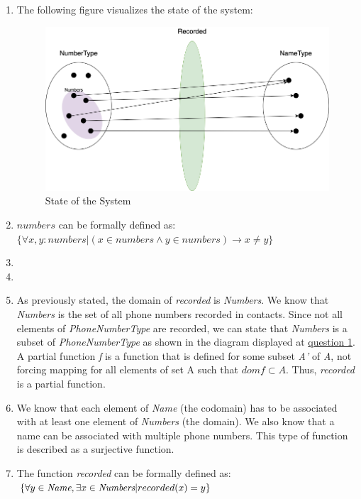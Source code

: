\begin{enumerate}
    \item The following figure visualizes the state of the system:
        \begin{figure}[h]
        \centering
        \includegraphics[scale=0.45]{images/Diagram.png}
        \caption{State of the System}
        \label{fig:Diagram}
        \end{figure}
    \item $numbers$ can be formally defined as: \\
    $\{ \forall x, y: numbers | (x \in numbers \wedge y \in numbers) \rightarrow x \neq y \}$
    \item
    \item
    \item As previously stated, the domain of \emph{recorded} is \emph{Numbers}. We know that \emph{Numbers} is the set 
    of all phone numbers recorded in contacts. Since not all elements of \emph{PhoneNumberType} are recorded, we can
    state that \emph{Numbers} is a subset of \emph{PhoneNumberType} as shown in the diagram displayed at \underline{question 1}.
    A partial function \emph{f} is a function that is defined for some subset \emph{A'} of \emph{A}, not forcing mapping for 
    all elements of set A such that $dom f \subset A$. Thus, \emph{recorded} is a partial function.
    \item We know that each element of \emph{Name} (the codomain) has to be associated with at least one element of 
    \emph{Numbers} (the domain). We also know that a name can be associated with multiple phone numbers. This type of 
    function is described as a surjective function. 
    \item The function \emph{recorded} can be formally defined as:\\
    $\{ \forall y \in \emph{Name},   \exists x \in \emph{Numbers} | recorded(x) = y \}$
\end{enumerate}
